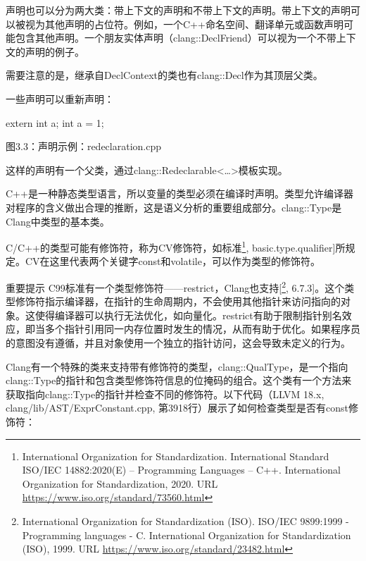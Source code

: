 
声明也可以分为两大类：带上下文的声明和不带上下文的声明。带上下文的声明可以被视为其他声明的占位符。例如，一个C++命名空间、翻译单元或函数声明可能包含其他声明。一个朋友实体声明（clang::DeclFriend）可以视为一个不带上下文的声明的例子。

需要注意的是，继承自DeclContext的类也有clang::Decl作为其顶层父类。

一些声明可以重新声明：

\begin{cpp}
extern int a;
int a = 1;
\end{cpp}

\begin{center}
图3.3：声明示例：redeclaration.cpp
\end{center}

这样的声明有一个父类，通过clang::Redeclarable<…>模板实现。


C++是一种静态类型语言，所以变量的类型必须在编译时声明。类型允许编译器对程序的含义做出合理的推断，这是语义分析的重要组成部分。clang::Type是Clang中类型的基本类。

C/C++的类型可能有修饰符，称为CV修饰符，如标准\footnote{International Organization for Standardization. International Standard ISO/IEC 14882:2020(E) – Programming Languages – C++. International Organization for Standardization, 2020. URL \url{https://www.iso.org/standard/73560.html}}, basic.type.qualifier]所规定。CV在这里代表两个关键字const和volatile，可以作为类型的修饰符。

\begin{myNotic}{重要提示}
C99标准有一个类型修饰符——restrict，Clang也支持[\footnote{International Organization for Standardization (ISO). ISO/IEC 9899:1999 - Programming languages - C. International Organization for Standardization (ISO), 1999. URL \url{https://www.iso.org/standard/23482.html}}, 6.7.3]。这个类型修饰符指示编译器，在指针的生命周期内，不会使用其他指针来访问指向的对象。这使得编译器可以执行无法优化，如向量化。restrict有助于限制指针别名效应，即当多个指针引用同一内存位置时发生的情况，从而有助于优化。如果程序员的意图没有遵循，并且对象使用一个独立的指针访问，这会导致未定义的行为。
\end{myNotic}

Clang有一个特殊的类来支持带有修饰符的类型，clang::QualType，是一个指向clang::Type的指针和包含类型修饰符信息的位掩码的组合。这个类有一个方法来获取指向clang::Type的指针并检查不同的修饰符。以下代码（LLVM 18.x, clang/lib/AST/ExprConstant.cpp, 第3918行）展示了如何检查类型是否有const修饰符：

